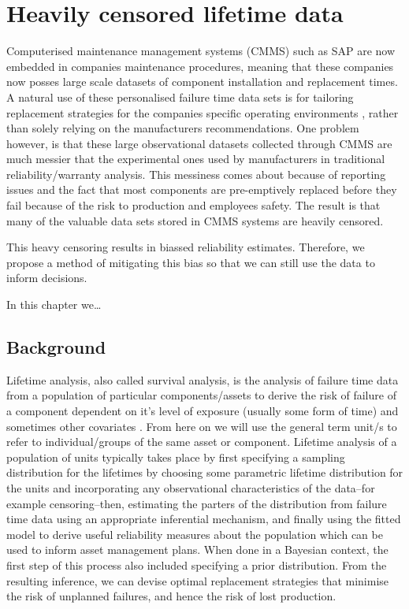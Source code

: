 \chapter{Heavily censored lifetime data}\label{chap:chapter2}

Computerised maintenance management systems (CMMS) such as SAP \citep{sap} are now embedded in companies maintenance procedures, meaning that these companies now posses large scale datasets of component installation and replacement times. A natural use of these personalised failure time data sets is for tailoring replacement strategies for the companies specific operating environments \citep[p. 13]{meeker2022}, rather than solely relying on the manufacturers recommendations. One problem however, is that these large observational datasets collected through CMMS are much messier that the experimental ones used by manufacturers in traditional reliability/warranty analysis. This messiness comes about because of reporting issues and the fact that most components are pre-emptively replaced before they fail because of the risk to production and employees safety. The result is that many of the valuable data sets stored in CMMS systems are heavily censored.

This heavy censoring results in biassed reliability estimates. Therefore, we propose a method of mitigating this bias so that we can still use the data to inform decisions.

In this chapter we\ldots

\section{Background}

Lifetime analysis, also called survival analysis, is the analysis of failure time data from a population of particular components/assets to derive the risk of failure of a component dependent on it's level of exposure (usually some form of time) and sometimes other covariates \citep{moore2016}. From here on we will use the general term unit/s to refer to individual/groups of the same asset or component. Lifetime analysis of a population of units typically takes place by first specifying a sampling distribution for the lifetimes by choosing some parametric lifetime distribution for the units and incorporating any observational characteristics of the data--for example censoring--then, estimating the parters of the distribution from failure time data using an appropriate inferential mechanism, and finally using the fitted model to derive useful reliability measures about the population which can be used to inform asset management plans. When done in a Bayesian context, the first step of this process also included specifying a prior distribution. From the resulting inference, we can devise optimal replacement strategies that minimise the risk of unplanned failures, and hence the risk of lost production.

